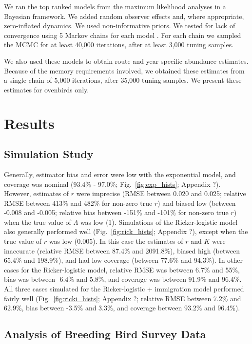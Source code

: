 \documentclass[12pt]{article}
\begin{document}
We ran the top ranked models from the maximum likelihood
analyses in a Bayesian framework.  We added random observer 
effects and, where appropriate, zero-inflated dynamics.  We used
non-informative priors. We tested for lack of convergence using
5 Markov chains for each model \citep{gelman_rubin:1992}.
For each chain we sampled the MCMC for at least 40,000 iterations, after at
least 3,000 tuning samples.  

We also used these models to obtain route and 
year specific abundance estimates.  Because of the memory requirements involved,
we obtained these estimates from a single chain of 5,000 iterations, after 35,000
tuning samples.  We present these estimates for ovenbirds only.

\section{Results}

\subsection{Simulation Study}

Generally, estimator bias and error were low with the exponential model, and 
coverage was nominal (93.4\% - 97.0\%; Fig.~\ref{fig:exp_hists}; Appendix ?). 
However, estimates of $r$ were 
imprecise (RMSE between 0.020 and 0.025; relative RMSE between 413\% and 
482\% for non-zero true $r$) and biased low (between -0.008 and -0.005; relative bias between
-151\% and -101\% for non-zero true $r$) when the true value of $\Lambda$ was low (1). 
Simulations of the Ricker-logistic model also generally performed well (Fig.~\ref{fig:rick_hists}; 
Appendix ?), except when the true value of $r$ was low (0.005). In this case the 
estimates of $r$ and $K$ were inaccurate (relative RMSE between 87.4\% and 2091.8\%),
biased high (between 65.4\% and 198.9\%), and had low coverage (between 77.6\% and 94.3\%).
In other cases for the Ricker-logistic model, relative RMSE was between 6.7\%
and 55\%, bias was between -6.4\% and 5.8\%, and coverage was between
91.9\% and 96.4\%.  All three cases simulated for the Ricker-logistic + immigration model 
performed fairly well (Fig.~\ref{fig:ricki_hists}; Appendix ?; relative RMSE between 7.2\% 
and 62.9\%, bias between -3.5\% and 3.3\%, and coverage between
93.2\% and 96.4\%).
  
\subsection{Analysis of Breeding Bird Survey Data}
\end{document}
